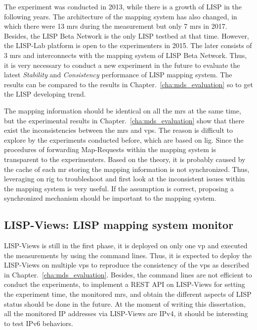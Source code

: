 The experiment was conducted in 2013, while there is a growth of LISP in the following years. The architecture of the mapping system has also changed, in which there were 13 \acrshort{mr}s during the measurement but only 7 \acrshort{mr}s in 2017. Besides, the LISP Beta Network is the only LISP testbed at that time. However, the LISP-Lab platform is open to the experimenters in 2015. The later consists of 3 \acrshort{mr}s and interconnects with the mapping system of LISP Beta Network. Thus, it is very necessary to conduct a new experiment in the future to evaluate the latest \emph{Stability} and \emph{Consistency} performance of LISP mapping system. The results can be compared to the results in Chapter.~\ref{cha:mds_evaluation} so to get the LISP developing trend. 

The mapping information should be identical on all the \acrshort{mr}s at the same time, but the experimental results in Chapter.~\ref{cha:mds_evaluation} show that there exist the inconsistencies between the \acrshort{mr}s and \acrshort{vp}s. The reason is difficult to explore by the experiments conducted before, which are based on \acrshort{lig}. Since the procedures of forwarding Map-Requests within the mapping system is transparent to the experimenters. Based on the theory, it is probably caused by the cache of each \acrshort{mr} storing the mapping information is not synchronized. Thus, leveraging on \acrshort{rig} to troubleshoot and first look at the inconsistent issues within the mapping system is very useful. If the assumption is correct, proposing a synchronized mechanism should be important to the mapping system.

\subsection{LISP-Views: LISP mapping system monitor}    
LISP-Views is still in the first phase, it is deployed on only one \acrshort{vp} and executed the measurements by using the command lines. Thus, it is expected to deploy the LISP-Views on multiple \acrshort{vp}s to reproduce the consistency of the \acrshort{vp}s as described in Chapter.~\ref{cha:mds_evaluation}. Besides, the command lines are not efficient to conduct the experiments, to implement a REST API on LISP-Views for setting the experiment time, the monitored \acrshort{mr}s, and obtain the different aspects of LISP status should be done in the future. At the moment of writing this dissertation, all the monitored IP addresses via LISP-Views are IPv4, it should be interesting to test IPv6 behaviors. 

